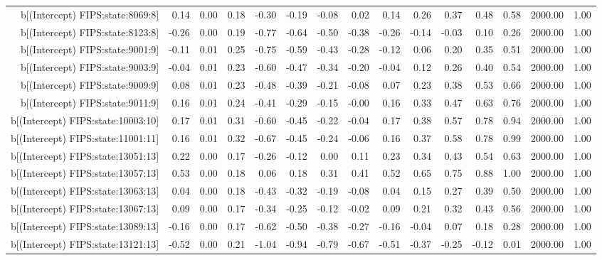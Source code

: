 \begin{table}[ht]
\begin{tabular}{rrrrrrrrrrrrrrr}
  b[(Intercept) FIPS:state:8069:8] & 0.14 & 0.00 & 0.18 & -0.30 & -0.19 & -0.08 & 0.02 & 0.14 & 0.26 & 0.37 & 0.48 & 0.58 & 2000.00 & 1.00 \\ 
  b[(Intercept) FIPS:state:8123:8] & -0.26 & 0.00 & 0.19 & -0.77 & -0.64 & -0.50 & -0.38 & -0.26 & -0.14 & -0.03 & 0.10 & 0.26 & 2000.00 & 1.00 \\ 
  b[(Intercept) FIPS:state:9001:9] & -0.11 & 0.01 & 0.25 & -0.75 & -0.59 & -0.43 & -0.28 & -0.12 & 0.06 & 0.20 & 0.35 & 0.51 & 2000.00 & 1.00 \\ 
  b[(Intercept) FIPS:state:9003:9] & -0.04 & 0.01 & 0.23 & -0.60 & -0.47 & -0.34 & -0.20 & -0.04 & 0.12 & 0.26 & 0.40 & 0.54 & 2000.00 & 1.00 \\ 
  b[(Intercept) FIPS:state:9009:9] & 0.08 & 0.01 & 0.23 & -0.48 & -0.39 & -0.21 & -0.08 & 0.07 & 0.23 & 0.38 & 0.53 & 0.66 & 2000.00 & 1.00 \\ 
  b[(Intercept) FIPS:state:9011:9] & 0.16 & 0.01 & 0.24 & -0.41 & -0.29 & -0.15 & -0.00 & 0.16 & 0.33 & 0.47 & 0.63 & 0.76 & 2000.00 & 1.00 \\ 
  b[(Intercept) FIPS:state:10003:10] & 0.17 & 0.01 & 0.31 & -0.60 & -0.45 & -0.22 & -0.04 & 0.17 & 0.38 & 0.57 & 0.78 & 0.94 & 2000.00 & 1.00 \\ 
  b[(Intercept) FIPS:state:11001:11] & 0.16 & 0.01 & 0.32 & -0.67 & -0.45 & -0.24 & -0.06 & 0.16 & 0.37 & 0.58 & 0.78 & 0.99 & 2000.00 & 1.00 \\ 
  b[(Intercept) FIPS:state:13051:13] & 0.22 & 0.00 & 0.17 & -0.26 & -0.12 & 0.00 & 0.11 & 0.23 & 0.34 & 0.43 & 0.54 & 0.63 & 2000.00 & 1.00 \\ 
  b[(Intercept) FIPS:state:13057:13] & 0.53 & 0.00 & 0.18 & 0.06 & 0.18 & 0.31 & 0.41 & 0.52 & 0.65 & 0.75 & 0.88 & 1.00 & 2000.00 & 1.00 \\ 
  b[(Intercept) FIPS:state:13063:13] & 0.04 & 0.00 & 0.18 & -0.43 & -0.32 & -0.19 & -0.08 & 0.04 & 0.15 & 0.27 & 0.39 & 0.50 & 2000.00 & 1.00 \\ 
  b[(Intercept) FIPS:state:13067:13] & 0.09 & 0.00 & 0.17 & -0.34 & -0.25 & -0.12 & -0.02 & 0.09 & 0.21 & 0.32 & 0.43 & 0.56 & 2000.00 & 1.00 \\ 
  b[(Intercept) FIPS:state:13089:13] & -0.16 & 0.00 & 0.17 & -0.62 & -0.50 & -0.38 & -0.27 & -0.16 & -0.04 & 0.07 & 0.18 & 0.28 & 2000.00 & 1.00 \\ 
  b[(Intercept) FIPS:state:13121:13] & -0.52 & 0.00 & 0.21 & -1.04 & -0.94 & -0.79 & -0.67 & -0.51 & -0.37 & -0.25 & -0.12 & 0.01 & 2000.00 & 1.00 \\ 

\end{tabular}
\end{table}
